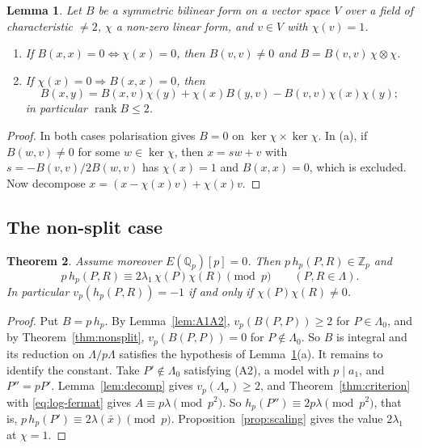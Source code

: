 \documentclass[11pt,a4paper]{amsart}
\newcommand{\Qp}{\mathbb{Q}_p}
\newcommand{\Zp}{\mathbb{Z}_p}
\newcommand{\Lam}{\Lambda}
\theoremstyle{plain}
\newtheorem{theorem}{Theorem}[section]
\newtheorem{lemma}[theorem]{Lemma}
\theoremstyle{definition}
\theoremstyle{remark}
\begin{document}
\begin{lemma}\label{lem:bilinear}
Let $B$ be a symmetric bilinear form on a vector space $V$ over a field of characteristic $\ne2$, $\chi$ a non-zero linear form, and $v\in V$ with $\chi(v)=1$.
\begin{enumerate}[label=\textup{(\alph*)}]
\item If $B(x,x)=0\iff\chi(x)=0$, then $B(v,v)\ne0$ and $B=B(v,v)\,\chi\otimes\chi$.
\item If $\chi(x)=0\Rightarrow B(x,x)=0$, then \[B(x,y)=B(x,v)\chi(y)+\chi(x)B(y,v)-B(v,v)\chi(x)\chi(y);\] in particular $\operatorname{rank}B\le2$.
\end{enumerate}
\end{lemma}

\begin{proof}
In both cases polarisation gives $B=0$ on $\ker\chi\times\ker\chi$. In (a), if $B(w,v)\ne0$ for some $w\in\ker\chi$, then $x=sw+v$ with $s=-B(v,v)/2B(w,v)$ has $\chi(x)=1$ and $B(x,x)=0$, which is excluded. Now decompose $x=(x-\chi(x)v)+\chi(x)v$.
\end{proof}

\subsection{The non-split case}

\begin{theorem}\label{thm:R}
Assume moreover $E(\Qp)[p]=0$. Then $p\,h_p(P,R)\in\Zp$ and
\[
p\,h_p(P,R)\equiv2\lambda_1\,\chi(P)\chi(R)\pmod p\qquad(P,R\in\Lam).
\]
In particular $v_p(h_p(P,R))=-1$ if and only if $\chi(P)\chi(R)\ne0$.
\end{theorem}

\begin{proof}
Put $B=p\,h_p$. By Lemma~\ref{lem:A1A2}, $v_p(B(P,P))\ge2$ for $P\in\Lam_0$, and by Theorem~\ref{thm:nonsplit}, $v_p(B(P,P))=0$ for $P\notin\Lam_0$. So $B$ is integral and its reduction on $\Lam/p\Lam$ satisfies the hypothesis of Lemma~\ref{lem:bilinear}(a). It remains to identify the constant. Take $P'\notin\Lam_0$ satisfying \textup{(A2)}, a model with $p\mid a_1$, and $P''=pP'$. Lemma~\ref{lem:decomp} gives $v_p(\Lambda_\sigma)\ge2$, and Theorem~\ref{thm:criterion} with \eqref{eq:log-fermat} gives $A\equiv p\lambda\pmod{p^2}$. So $h_p(P'')\equiv2p\lambda\pmod{p^2}$, that is, $p\,h_p(P')\equiv2\lambda(\bar x)\pmod p$. Proposition~\ref{prop:scaling} gives the value $2\lambda_1$ at $\chi=1$.
\end{proof}
\end{document}
